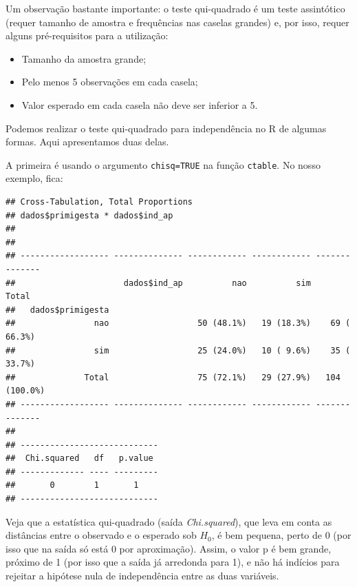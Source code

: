 \documentclass[
]{book}
\newenvironment{Shaded}{\begin{snugshade}}{\end{snugshade}}
\newcommand{\DataTypeTok}[1]{\textcolor[rgb]{0.13,0.29,0.53}{#1}}
\newcommand{\KeywordTok}[1]{\textcolor[rgb]{0.13,0.29,0.53}{\textbf{#1}}}
\newcommand{\NormalTok}[1]{#1}
\newcommand{\OperatorTok}[1]{\textcolor[rgb]{0.81,0.36,0.00}{\textbf{#1}}}
\newcommand{\OtherTok}[1]{\textcolor[rgb]{0.56,0.35,0.01}{#1}}
\newcommand{\StringTok}[1]{\textcolor[rgb]{0.31,0.60,0.02}{#1}}
\providecommand{\tightlist}{%
  \setlength{\itemsep}{0pt}\setlength{\parskip}{0pt}}
\begin{document}
Um observação bastante importante: o teste qui-quadrado é um teste assintótico (requer tamanho de amostra e frequências nas caselas grandes) e, por isso, requer alguns pré-requisitos para a utilização:

\begin{itemize}
\tightlist
\item
  Tamanho da amostra grande;
\item
  Pelo menos 5 observações em cada casela;
\item
  Valor esperado em cada casela não deve ser inferior a 5.
\end{itemize}

Podemos realizar o teste qui-quadrado para independência no R de algumas formas. Aqui apresentamos duas delas.

A primeira é usando o argumento \texttt{chisq=TRUE} na função \texttt{ctable}. No nosso exemplo, fica:

\begin{Shaded}
\end{Shaded}

\begin{verbatim}
## Cross-Tabulation, Total Proportions  
## dados$primigesta * dados$ind_ap  
## 
## 
## ------------------ -------------- ------------ ------------ --------------
##                      dados$ind_ap          nao          sim          Total
##   dados$primigesta                                                        
##                nao                  50 (48.1%)   19 (18.3%)    69 ( 66.3%)
##                sim                  25 (24.0%)   10 ( 9.6%)    35 ( 33.7%)
##              Total                  75 (72.1%)   29 (27.9%)   104 (100.0%)
## ------------------ -------------- ------------ ------------ --------------
## 
## ----------------------------
##  Chi.squared   df   p.value 
## ------------- ---- ---------
##       0        1       1    
## ----------------------------
\end{verbatim}

Veja que a estatística qui-quadrado (saída \emph{Chi.squared}), que leva em conta as distâncias entre o observado e o esperado sob \(H_0\), é bem pequena, perto de 0 (por isso que na saída só está 0 por aproximação). Assim, o valor p é bem grande, próximo de 1 (por isso que a saída já arredonda para 1), e não há indícios para rejeitar a hipótese nula de independência entre as duas variáveis.
\end{document}
